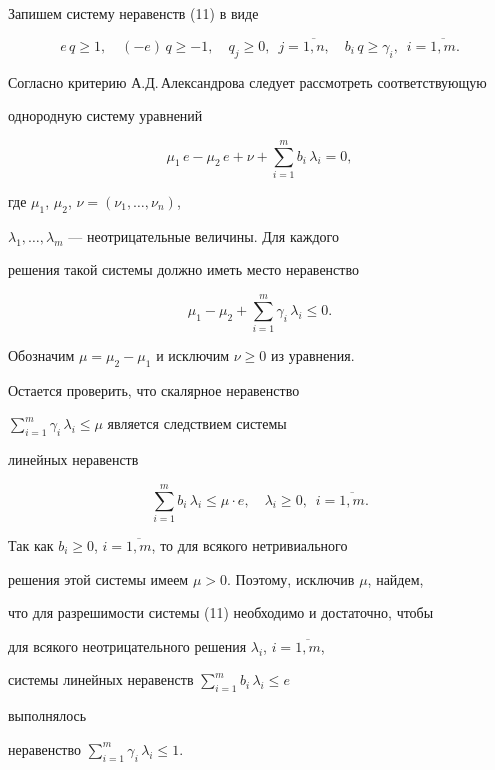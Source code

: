 \begin{pf} Запишем систему неравенств (11) в виде


$$


e\,q\ge 1,\quad (-e)\,q\ge -1,\quad q_j\ge 0,\; \ j=\overline{1,n},


\quad b_i\,q\ge\gamma_i,\; \ i=\overline{1,m}.


$$


Согласно критерию А.Д.\,Александрова следует рассмотреть соответствующую


однородную систему уравнений


$$


\mu_1\,e-\mu_2\,e+\nu+\sum_{i=1}^m b_i\,\lambda_i=0,


$$


где $\mu_1$, $\mu_2$, $\nu =(\nu_1,\dotsc,\nu_n)$,


$\lambda_1,\dotsc,\lambda_m$ --- неотрицательные величины. Для каждого


решения такой системы должно иметь место неравенство


$$


\mu_1-\mu_2+\sum_{i=1}^m\gamma_i\,\lambda_i\le 0.


$$


Обозначим $\mu=\mu_2-\mu_1$ и исключим $\nu\ge 0$ из уравнения.


Остается проверить, что скалярное неравенство


$\sum\limits_{i=1}^m\gamma_i\,\lambda_i\le\mu$ является следствием системы


линейных неравенств


$$


\sum_{i=1}^m b_i\,\lambda_i\le\mu\cdot e,\quad \lambda_i\ge 0,\; \


i=\overline{1,m}.


$$


Так как $b_i\ge 0$, $i=\overline{1,m}$, то для всякого нетривиального


решения этой системы имеем $\mu > 0$. Поэтому, исключив $\mu $, найдем,


что для разрешимости системы (11) необходимо и достаточно, чтобы


для всякого неотрицательного решения $\lambda_i$, $i=\overline{1,m}$,


системы линейных неравенств $\sum\limits_{i=1}^m b_i\,\lambda_i\le e$


выполнялось


неравенство $\sum\limits_{i=1}^m\gamma_i\,\lambda_i\le 1$.



\end{pf}
